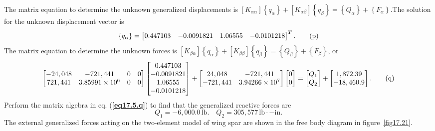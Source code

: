 \documentclass{AeroStructure-ERJohnson}
\begin{document}
\begin{example}
The matrix equation to determine the unknown generalized displacements is $\left[K_{\alpha \alpha}\right]\left\{q_{\alpha}\right\}+\left[K_{\alpha \beta}\right]\left\{q_{\beta}\right\}=\left\{Q_{\alpha}\right\}+\left\{F_{\alpha}\right\}$.The solution for the unknown displacement vector is
\begin{equation}
\left\{q_{\alpha}\right\}=\left[\begin{array}{@{}llll@{}}0.447103 & -0.0091821 & 1.06555 & -0.0101218\end{array}\right]^{T}. \label{eq17.5.p}\tag{p}
\end{equation}
The matrix equation to determine the unknown forces is $\left[K_{\beta \alpha}\right]\left\{q_{\alpha}\right\}+\left[K_{\beta \beta}\right]\left\{q_{\beta}\right\}=\left\{Q_{\beta}\right\}+\left\{F_{\beta}\right\}$, or
\begin{equation}
\left[\begin{array}{@{}cccc@{}}-24,048 & -721,441 & 0 & 0 \\721,441 & 3.85991 \times 10^{6} & 0 & 0\end{array}\right]\left[\begin{array}{@{}c@{}}0.447103 \\-0.0091821 \\1.06555 \\-0.0101218\end{array}\right]+\left[\begin{array}{@{}cc@{}}24,048 & -721,441 \\-721,441 & 3.94266 \times 10^{7}\end{array}\right]\left[\begin{array}{@{}l@{}}0 \\0\end{array}\right]=\left[\begin{array}{@{}l@{}}Q_{1} \\Q_{2}\end{array}\right]+\left[\begin{array}{@{}c@{}}1,872.39 \\-18,460.9\end{array}\right]. \label{eq17.5.q}\tag{q}
\end{equation}
Perform the matrix algebra in eq. (\textbf{\ref{eq17.5.q}}) to find that the generalized reactive forces are
\begin{equation}
Q_{1}=-6{,}000.0\,\mathrm{lb}. \quad Q_{2}=305,577\,\mathrm{lb} \cdot-\mathrm{in}. \label{eq17.5.r}\tag{r}
\end{equation}
The external generalized forces acting on the two-element model of wing spar are shown in the free body diagram in figure~\ref{fig17.21}.
\end{example}
\vspace*{-1\baselineskip}
\end{document}
